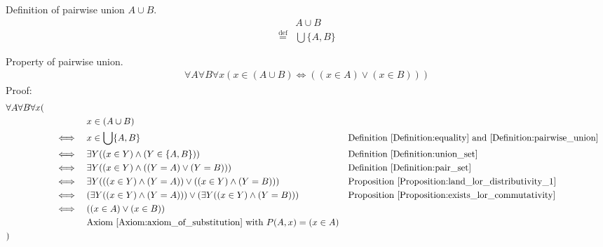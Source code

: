 \begin{defn}
\label{Definition:pairwise_union}
Definition of pairwise union $A \cup B$.
\begin{align*}
& A \cup B \\
\overset{\operatorname{def}}{=} & \bigcup \{ A,B \}
\end{align*}
\end{defn}

\begin{prop}
\label{Proposition:pairwise_union_property}
Property of pairwise union.
\begin{align*}
\forall A \forall B \forall x (x \in (A \cup B) \iff ((x \in A) \lor (x \in B)))
\end{align*}
Proof:
\begin{align*}
& \forall A \forall B \forall x ( \\
& \quad && && x \in (A \cup B) \\
& \quad && \iff && x \in  \bigcup \{ A,B \}
&& \text{Definition \ref{Definition:equality} and \ref{Definition:pairwise_union}} \\
& \quad && \iff && \exists Y ((x \in Y) \land (Y \in \{ A,B \} ))
&& \text{Definition \ref{Definition:union_set}} \\
& \quad && \iff && \exists Y ((x \in Y) \land ((Y = A) \lor (Y = B) ))
&& \text{Definition \ref{Definition:pair_set}} \\
& \quad && \iff && \exists Y( ((x \in Y) \land (Y = A)) \lor ((x \in Y) \land (Y = B)) )
&& \text{Proposition \ref{Proposition:land_lor_distributivity_1}} \\
& \quad && \iff && (\exists Y ((x \in Y) \land (Y = A))) \lor (\exists Y ((x \in Y) \land (Y = B)))
&& \text{Proposition \ref{Proposition:exists_lor_commutativity}} \\
& \quad && \iff && ((x \in A) \lor (x \in B)) \\
& \quad && && \text{Axiom \ref{Axiom:axiom_of_substitution} with $P(A,x) = (x \in A)$} \\
& )
\end{align*}
\end{prop}

